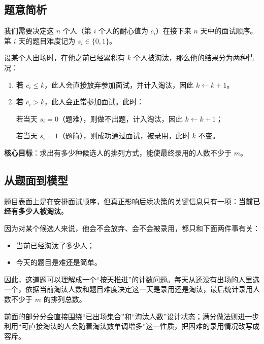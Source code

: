 \documentclass{book}
\begin{document}
\subsection{题意简析}

我们需要决定这 $n$ 个人（第 $i$ 个人的耐心值为 $c_i$）在接下来 $n$ 天中的面试顺序。第 $i$ 天的题目难度记为 $s_i \in \{0,1\}$。

设某个人出场时，在他之前已经累积有 $k$ 个人被淘汰，那么他的结果分为两种情况：

\begin{enumerate}[itemsep=2pt, topsep=2pt, parsep=0pt, partopsep=0pt]
    \item \textbf{若 $c_i \le k$}，此人会直接放弃参加面试，并计入淘汰，因此 $k \leftarrow k+1$。

    \item \textbf{若 $c_i > k$}，此人会正常参加面试。此时：
    
    \quad 若当天 $s_i = 0$（题难），则做不出题，计入淘汰，因此 $k \leftarrow k+1$；

    \quad 若当天 $s_i = 1$（题简），则成功通过面试，被录用，此时 $k$ 不变。
\end{enumerate}

\textbf{核心目标}：求出有多少种候选人的排列方式，能使最终录用的人数不少于 $m$。

\subsection{从题面到模型}

题目表面上是在安排面试顺序，但真正影响后续决策的关键信息只有一项：\textbf{当前已经有多少人被淘汰}。

因为对某个候选人来说，他会不会放弃、会不会被录用，都只和下面两件事有关：

\begin{itemize}[leftmargin=2em,itemsep=1pt,topsep=2pt,parsep=0pt,partopsep=0pt]
    \item 当前已经淘汰了多少人；
    \item 今天的题目是难还是简单。
\end{itemize}

因此，这道题可以理解成一个“按天推进”的计数问题。每天从还没有出场的人里选一个，依据当前淘汰人数和题目难度决定这一天是录用还是淘汰，最后统计录用人数不少于 $m$ 的排列总数。

前面的部分分会直接围绕“已出场集合”和“淘汰人数”设计状态；满分做法则进一步利用“可直接淘汰的人会随着淘汰数单调增多”这一性质，把困难的录用情况改写成容斥。
\end{document}
